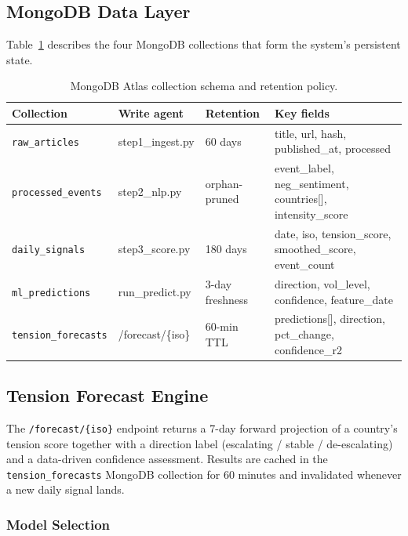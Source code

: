 \documentclass[12pt,a4paper]{report}
\begin{document}
\subsection{MongoDB Data Layer}

Table~\ref{tab:collections} describes the four MongoDB collections that
form the system's persistent state.

\begin{table}[H]
\centering
\caption{MongoDB Atlas collection schema and retention policy.}
\label{tab:collections}
\begin{tabular}{p{3.0cm}p{2.5cm}p{2.0cm}p{5.0cm}}
\toprule
\textbf{Collection} & \textbf{Write agent} & \textbf{Retention} &
\textbf{Key fields} \\
\midrule
\texttt{raw\_articles}
  & step1\_ingest.py & 60 days
  & title, url, hash, published\_at, processed \\
\addlinespace[4pt]
\texttt{processed\_events}
  & step2\_nlp.py & orphan-pruned
  & event\_label, neg\_sentiment, countries[], intensity\_score \\
\addlinespace[4pt]
\texttt{daily\_signals}
  & step3\_score.py & 180 days
  & date, iso, tension\_score, smoothed\_score, event\_count \\
\addlinespace[4pt]
\texttt{ml\_predictions}
  & run\_predict.py & 3-day freshness
  & direction, vol\_level, confidence, feature\_date \\
\addlinespace[4pt]
\texttt{tension\_forecasts}
  & /forecast/\{iso\} & 60-min TTL
  & predictions[], direction, pct\_change, confidence\_r2 \\
\bottomrule
\end{tabular}
\end{table}

\subsection{Tension Forecast Engine}
\label{subsec:forecast-engine}

The \texttt{/forecast/\{iso\}} endpoint returns a 7-day forward projection
of a country's tension score together with a direction label
(escalating / stable / de-escalating) and a data-driven confidence
assessment. Results are cached in the \texttt{tension\_forecasts} MongoDB
collection for 60 minutes and invalidated whenever a new daily signal
lands.

\subsubsection{Model Selection}
\end{document}
